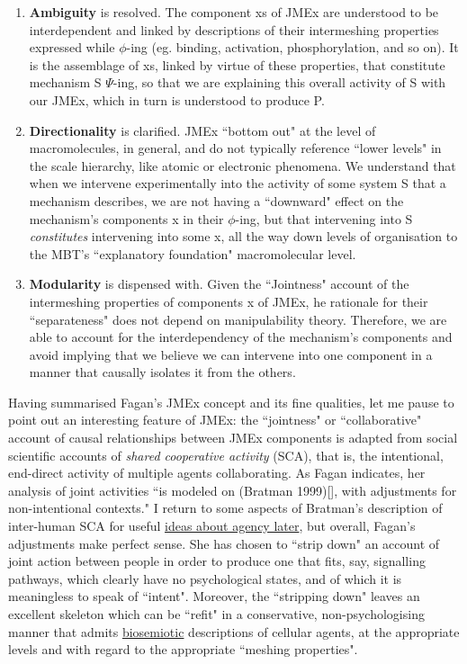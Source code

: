 \begin{enumerate}
\item \textbf{Ambiguity} is resolved. The component xs of JMEx are understood to be interdependent and linked by descriptions of their intermeshing properties expressed while $\phi$-ing (eg. binding, activation, phosphorylation, and so on). It is the assemblage of xs, linked by virtue of these properties, that constitute mechanism S $\Psi$-ing, so that we are explaining this overall activity of S with our JMEx, which in turn is understood to produce P.

\item \textbf{Directionality} is clarified. JMEx ``bottom out" at the level of macromolecules, in general, and do not typically reference ``lower levels" in the scale hierarchy, like atomic or electronic phenomena. We understand that when we intervene experimentally into the activity of some system S that a mechanism describes, we are not having a ``downward" effect on the mechanism's components x in their $\phi$-ing, but that intervening into S \textit{constitutes} intervening into some x, all the way down levels of organisation to the MBT's ``explanatory foundation" macromolecular level.

\item \textbf{Modularity} is dispensed with. Given the ``Jointness" account of the intermeshing properties of components x of JMEx, he rationale for their ``separateness" does not depend on manipulability theory. Therefore, we are able to account for the interdependency of the mechanism's components and avoid implying that we believe we can intervene into one component in a manner that causally isolates it from the others.
\end{enumerate}

Having summarised Fagan's JMEx concept and its fine qualities, let me pause to point out an interesting feature of JMEx: the ``jointness" or ``collaborative" account of causal relationships between JMEx components is adapted from social scientific accounts of \textit{shared cooperative activity} (SCA), that is, the intentional, end-direct activity of multiple agents collaborating. As Fagan indicates, her analysis of joint activities ``is modeled on (Bratman 1999)[\cite[pp.93-108]{Bratman1999}], with adjustments for non-intentional contexts." \cite{Fagan2015} I return to some aspects of Bratman's description of inter-human SCA for useful \hyperref[agentmodel]{ideas about agency later}, but overall, Fagan's adjustments make perfect sense. She has chosen to ``strip down" an account of joint action between people in order to produce one that fits, say, signalling pathways, which clearly have no psychological states, and of which it is meaningless to speak of ``intent". Moreover, the ``stripping down" leaves an excellent skeleton which can be ``refit" in a conservative, non-psychologising manner that admits \hyperref[biosemiotics]{biosemiotic} descriptions of cellular agents, at the appropriate levels and with regard to the appropriate ``meshing properties". 

